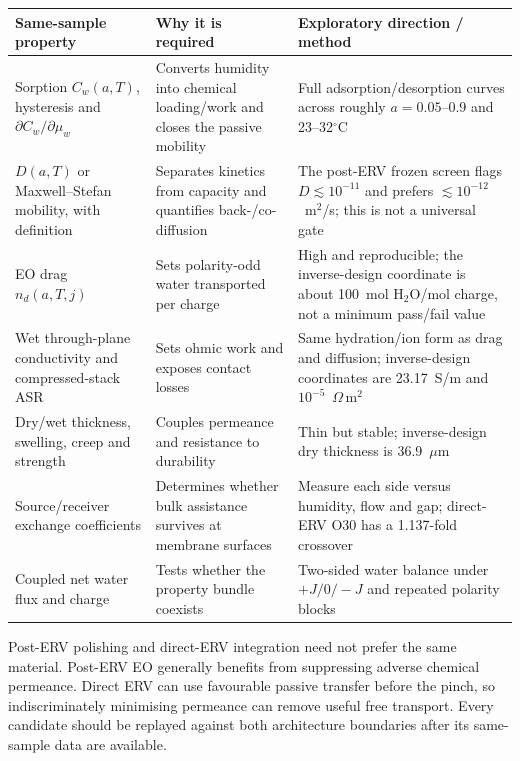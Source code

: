 \documentclass[10pt,a4paper]{article}
\begin{document}
\begin{center}\small
\begin{tabularx}{\textwidth}{@{}p{45mm}Y Y@{}}
\toprule
\textbf{Same-sample property} & \textbf{Why it is required} & \textbf{Exploratory direction / method} \\
\midrule
Sorption $C_w(a,T)$, hysteresis and $\partial C_w/\partial\mu_w$ & Converts humidity into chemical loading/work and closes the passive mobility & Full adsorption/desorption curves across roughly $a=0.05$--0.9 and 23--32$^\circ$C \\
$D(a,T)$ or Maxwell--Stefan mobility, with definition & Separates kinetics from capacity and quantifies back-/co-diffusion & The post-ERV frozen screen flags $D\lesssim10^{-11}$ and prefers $\lesssim10^{-12}$~m$^2$/s; this is not a universal gate \\
EO drag $n_d(a,T,j)$ & Sets polarity-odd water transported per charge & High and reproducible; the inverse-design coordinate is about 100~mol H$_2$O/mol charge, not a minimum pass/fail value \\
Wet through-plane conductivity and compressed-stack ASR & Sets ohmic work and exposes contact losses & Same hydration/ion form as drag and diffusion; inverse-design coordinates are 23.17~S/m and $10^{-5}$~$\Omega\,\mathrm{m}^2$ \\
Dry/wet thickness, swelling, creep and strength & Couples permeance and resistance to durability & Thin but stable; inverse-design dry thickness is 36.9~$\mu$m \\
Source/receiver exchange coefficients & Determines whether bulk assistance survives at membrane surfaces & Measure each side versus humidity, flow and gap; direct-ERV O30 has a 1.137-fold crossover \\
Coupled net water flux and charge & Tests whether the property bundle coexists & Two-sided water balance under $+J/0/-J$ and repeated polarity blocks \\
\bottomrule
\end{tabularx}
\end{center}

Post-ERV polishing and direct-ERV integration need not prefer the same
material. Post-ERV EO generally benefits from suppressing adverse chemical
permeance. Direct ERV can use favourable passive transfer before the pinch, so
indiscriminately minimising permeance can remove useful free transport. Every
candidate should be replayed against both architecture boundaries after its
same-sample data are available.
\end{document}

